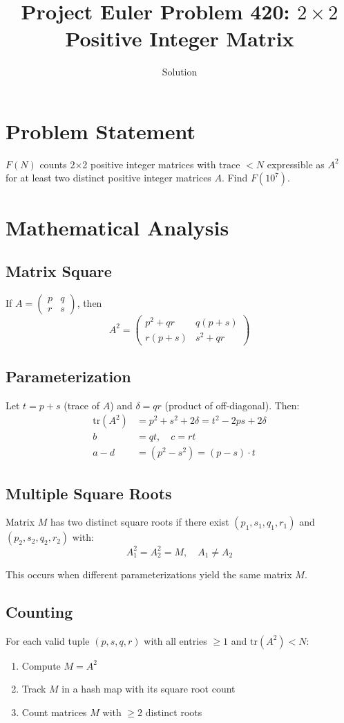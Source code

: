 \documentclass[12pt]{article}
\title{Project Euler Problem 420: $2 \times 2$ Positive Integer Matrix}
\author{Solution}
\date{}
\begin{document}
\maketitle

\section{Problem Statement}
$F(N)$ counts 2$\times$2 positive integer matrices with trace $< N$ expressible as $A^2$ for at least two distinct positive integer matrices $A$. Find $F(10^7)$.

\section{Mathematical Analysis}

\subsection{Matrix Square}
If $A = \begin{pmatrix} p & q \\ r & s \end{pmatrix}$, then
\[
A^2 = \begin{pmatrix} p^2 + qr & q(p+s) \\ r(p+s) & s^2 + qr \end{pmatrix}
\]

\subsection{Parameterization}
Let $t = p + s$ (trace of $A$) and $\delta = qr$ (product of off-diagonal). Then:
\begin{align}
\mathrm{tr}(A^2) &= p^2 + s^2 + 2\delta = t^2 - 2ps + 2\delta \\
b &= qt, \quad c = rt \\
a - d &= (p^2 - s^2) = (p-s) \cdot t
\end{align}

\subsection{Multiple Square Roots}
Matrix $M$ has two distinct square roots if there exist $(p_1, s_1, q_1, r_1)$ and $(p_2, s_2, q_2, r_2)$ with:
\[
A_1^2 = A_2^2 = M, \quad A_1 \neq A_2
\]

This occurs when different parameterizations yield the same matrix $M$.

\subsection{Counting}
For each valid tuple $(p, s, q, r)$ with all entries $\geq 1$ and $\mathrm{tr}(A^2) < N$:
\begin{enumerate}
    \item Compute $M = A^2$
    \item Track $M$ in a hash map with its square root count
    \item Count matrices $M$ with $\geq 2$ distinct roots
\end{enumerate}
\end{document}
